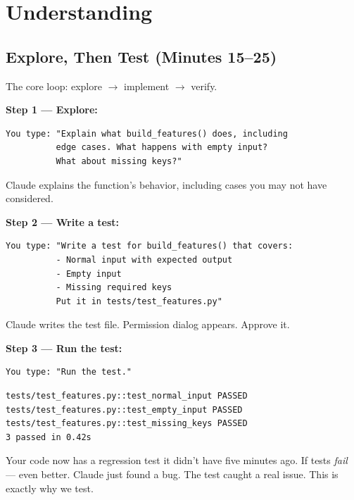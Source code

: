 \documentclass[10pt,oneside]{scrartcl}
\begin{document}
\section{Understanding}

\subsection{Explore, Then Test (Minutes 15--25)}

The core loop: explore $\rightarrow$ implement $\rightarrow$ verify.

\textbf{Step 1 --- Explore:}

\begin{verbatim}
You type: "Explain what build_features() does, including
          edge cases. What happens with empty input?
          What about missing keys?"
\end{verbatim}

Claude explains the function's behavior, including cases you may not have considered.

\textbf{Step 2 --- Write a test:}

\begin{verbatim}
You type: "Write a test for build_features() that covers:
          - Normal input with expected output
          - Empty input
          - Missing required keys
          Put it in tests/test_features.py"
\end{verbatim}


Claude writes the test file. Permission dialog appears. Approve it.

\textbf{Step 3 --- Run the test:}

\begin{verbatim}
You type: "Run the test."
\end{verbatim}

\begin{verbatim}
tests/test_features.py::test_normal_input PASSED
tests/test_features.py::test_empty_input PASSED
tests/test_features.py::test_missing_keys PASSED
3 passed in 0.42s
\end{verbatim}

Your code now has a regression test it didn't have five minutes ago. If tests \emph{fail} --- even better. Claude just found a bug. The test caught a real issue. This is exactly why we test.
\end{document}
